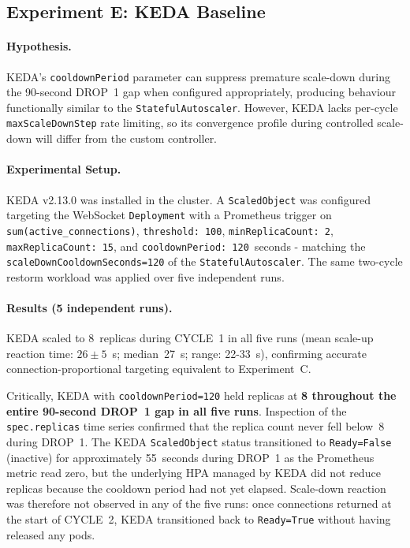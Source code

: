 \documentclass[twocolumn]{svjour3}
\begin{document}
\subsection{Experiment E: KEDA Baseline}
\label{sec:experiment_e}

\paragraph{Hypothesis.}  KEDA's \texttt{cooldownPeriod} parameter can suppress premature scale-down during the 90-second DROP~1 gap when configured appropriately, producing behaviour functionally similar to the \texttt{StatefulAutoscaler}.  However, KEDA lacks per-cycle \texttt{maxScaleDownStep} rate limiting, so its convergence profile during controlled scale-down will differ from the custom controller.

\paragraph{Experimental Setup.}  KEDA v2.13.0 was installed in the cluster.  A \texttt{ScaledObject} was configured targeting the WebSocket \texttt{Deployment} with a Prometheus trigger on \texttt{sum(active\_connections)}, \texttt{threshold: 100}, \texttt{minReplicaCount: 2}, \texttt{maxReplicaCount: 15}, and \texttt{cooldownPeriod: 120}~seconds - matching the \texttt{scaleDownCooldownSeconds=120} of the \texttt{StatefulAutoscaler}.  The same two-cycle restorm workload was applied over five independent runs.

\paragraph{Results (5 independent runs).}
KEDA scaled to 8~replicas during CYCLE~1 in all five runs (mean scale-up reaction time: $26 \pm 5$~s; median~27~s; range: 22-33~s), confirming accurate connection-proportional targeting equivalent to Experiment~C.

Critically, KEDA with \texttt{cooldownPeriod=120} held replicas at \textbf{8 throughout the entire 90-second DROP~1 gap in all five runs}.  Inspection of the \texttt{spec.replicas} time series confirmed that the replica count never fell below~8 during DROP~1.  The KEDA \texttt{ScaledObject} status transitioned to \texttt{Ready=False} (inactive) for approximately 55~seconds during DROP~1 as the Prometheus metric read zero, but the underlying HPA managed by KEDA did not reduce replicas because the cooldown period had not yet elapsed.  Scale-down reaction was therefore not observed in any of the five runs: once connections returned at the start of CYCLE~2, KEDA transitioned back to \texttt{Ready=True} without having released any pods.
\end{document}
